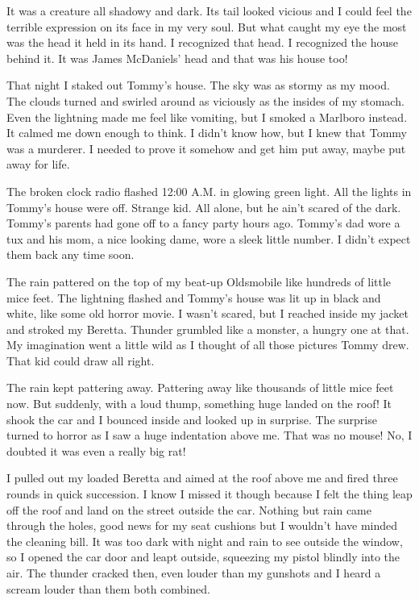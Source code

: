 It was a creature all shadowy and dark. Its tail looked vicious and
I could feel the terrible expression on its face in my very soul.
But what caught my eye the most was the head it held in its hand. I
recognized that head. I recognized the house behind it. It was
James McDaniels' head and that was his house too!



That night I staked out Tommy's house. The sky was as stormy
as my mood. The clouds turned and swirled around as viciously as
the insides of my stomach. Even the lightning made me feel like
vomiting, but I smoked a Marlboro instead. It calmed me down enough
to think. I didn't know how, but I knew that Tommy was a
murderer. I needed to prove it somehow and get him put away, maybe
put away for life.



The broken clock radio flashed 12:00 A.M. in glowing green light.
All the lights in Tommy's house were off. Strange kid. All
alone, but he ain't scared of the dark. Tommy's parents
had gone off to a fancy party hours ago. Tommy's dad wore a
tux and his mom, a nice looking dame, wore a sleek little number. I
didn't expect them back any time soon.



The rain pattered on the top of my beat-up Oldsmobile like hundreds
of little mice feet. The lightning flashed and Tommy's house
was lit up in black and white, like some old horror movie. I
wasn't scared, but I reached inside my jacket and stroked my
Beretta. Thunder grumbled like a monster, a hungry one at that. My
imagination went a little wild as I thought of all those pictures
Tommy drew. That kid could draw all right.



The rain kept pattering away. Pattering away like thousands of
little mice feet now. But suddenly, with a loud thump, something
huge landed on the roof! It shook the car and I bounced inside and
looked up in surprise. The surprise turned to horror as I saw a
huge indentation above me. That was no mouse! No, I doubted it was
even a really big rat!



I pulled out my loaded Beretta and aimed at the roof above me and
fired three rounds in quick succession. I know I missed it though
because I felt the thing leap off the roof and land on the street
outside the car. Nothing but rain came through the holes, good news
for my seat cushions but I wouldn't have minded the cleaning
bill. It was too dark with night and rain to see outside the
window, so I opened the car door and leapt outside, squeezing my
pistol blindly into the air. The thunder cracked then, even louder
than my gunshots and I heard a scream louder than them both
combined.




